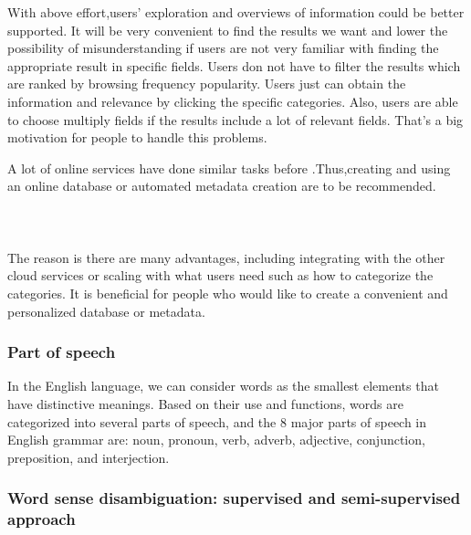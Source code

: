 With above effort,users' exploration and overviews of information could be better supported. It will be very convenient to find the results we want and lower the possibility of misunderstanding if users are not very familiar with finding the appropriate result in specific fields.\cite{TunThuraThet2010} Users don not have to filter the results which are ranked by browsing frequency popularity. Users just can obtain the information and relevance by clicking the specific categories. Also, users are able to choose multiply fields if the results include a lot of relevant fields. That's a big motivation for people to handle this problems. 

A lot of online services have done similar tasks before .Thus,creating and using an online database or automated metadata creation are to be recommended. \\\\\\\\ The reason is there are many advantages, including integrating with the other cloud services or scaling with what users need such as how to categorize the categories. It is beneficial for people who would like to create a convenient and personalized database or metadata.\\

\subsubsection*{Part of speech}

In the English language, we can consider words as the smallest elements that have distinctive meanings. Based on their use and functions, words are categorized into several parts of speech, and the 8 major parts of speech in English grammar are: noun, pronoun, verb, adverb, adjective, conjunction, preposition, and interjection.

\subsubsection*{Word sense disambiguation: supervised and semi-supervised approach}

